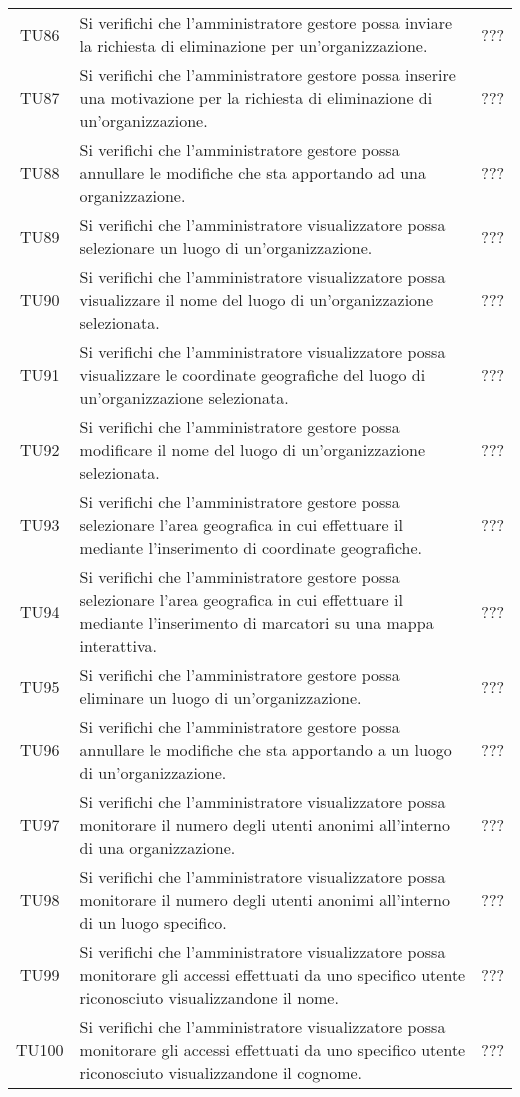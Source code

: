 {\begin{longtable}{ c  C{9cm} C{1cm}}
TU86 & Si verifichi che l'amministratore gestore possa inviare la richiesta di eliminazione per un'organizzazione. & ??? \\
TU87 & Si verifichi che l'amministratore gestore possa inserire una motivazione per la richiesta di eliminazione di un'organizzazione. & ??? \\
TU88 & Si verifichi che l'amministratore gestore possa annullare le modifiche che sta apportando ad una organizzazione. & ??? \\
TU89 & Si verifichi che l’amministratore visualizzatore possa selezionare un luogo di un’organizzazione. & ??? \\
TU90 & Si verifichi che l'amministratore visualizzatore possa visualizzare il nome del luogo di un’organizzazione selezionata. & ??? \\
TU91 & Si verifichi che l'amministratore visualizzatore possa visualizzare le coordinate geografiche del luogo di un’organizzazione selezionata. & ??? \\
TU92 & Si verifichi che l'amministratore gestore possa modificare il nome del luogo di un’organizzazione selezionata. & ??? \\
TU93 & Si verifichi che l'amministratore gestore possa selezionare l'area geografica in cui effettuare il  mediante l'inserimento di coordinate geografiche. & ??? \\
TU94 & Si verifichi che l'amministratore gestore possa selezionare l'area geografica in cui effettuare il  mediante l'inserimento di marcatori su una mappa interattiva. & ??? \\
TU95 & Si verifichi che l'amministratore gestore possa eliminare un luogo di un’organizzazione. & ??? \\
TU96 & Si verifichi che l'amministratore gestore possa annullare le modifiche che sta apportando a un luogo di un’organizzazione.  & ??? \\
TU97 & Si verifichi che l’amministratore visualizzatore possa monitorare il numero degli utenti anonimi all’interno di una organizzazione. & ??? \\
TU98 & Si verifichi che l’amministratore visualizzatore possa monitorare il numero degli utenti anonimi all’interno di un luogo specifico. & ??? \\
TU99 & Si verifichi che l’amministratore visualizzatore possa monitorare gli accessi effettuati da uno specifico utente riconosciuto visualizzandone il nome. & ??? \\
TU100 & Si verifichi che l’amministratore visualizzatore possa monitorare gli accessi effettuati da uno specifico utente riconosciuto visualizzandone il cognome. & ??? \\

\end{longtable}}
